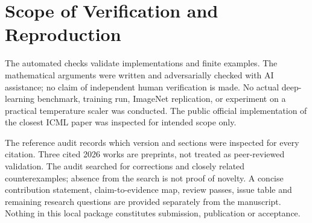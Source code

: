 \documentclass{article}
\begin{document}
\section{Scope of Verification and Reproduction}

The automated checks validate implementations and finite examples. The mathematical arguments were written and adversarially checked with AI assistance; no claim of independent human verification is made. No actual deep-learning benchmark, training run, ImageNet replication, or experiment on a practical temperature scaler was conducted. The public official implementation of the closest ICML paper was inspected for intended scope only.

The reference audit records which version and sections were inspected for every citation. Three cited 2026 works are preprints, not treated as peer-reviewed validation. The audit searched for corrections and closely related counterexamples; absence from the search is not proof of novelty. A concise contribution statement, claim-to-evidence map, review passes, issue table and remaining research questions are provided separately from the manuscript. Nothing in this local package constitutes submission, publication or acceptance.
\end{document}
